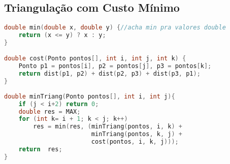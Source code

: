 \subsection*{Triangulação com Custo Mínimo}
\begin{lstlisting}[language=C++]
double min(double x, double y) {//acha min pra valores double
    return (x <= y) ? x : y;
}

double cost(Ponto pontos[], int i, int j, int k) {
    Ponto p1 = pontos[i], p2 = pontos[j], p3 = pontos[k];
    return dist(p1, p2) + dist(p2, p3) + dist(p3, p1);
}
 
double minTriang(Ponto pontos[], int i, int j){
	if (j < i+2) return 0;
   	double res = MAX;
   	for (int k= i + 1; k < j; k++)
    	res = min(res, (minTriang(pontos, i, k) + 
        				minTriang(pontos, k, j) + 
                        cost(pontos, i, k, j)));
   	return  res;
}
\end{lstlisting}